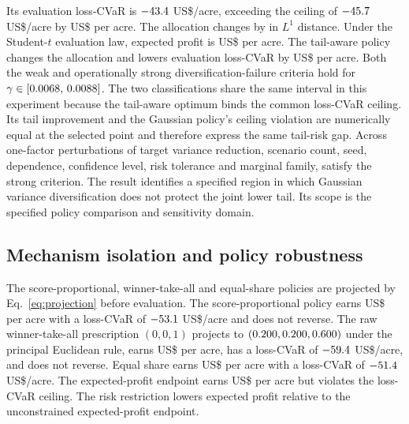 Its evaluation loss-CVaR is
\(-43.4\) US\$/acre, exceeding the ceiling of
\(-45.7\) US\$/acre by
US\$\DiversificationCeilingGap{} per acre. The allocation changes by
\DiversificationAllocationLone{} in \(L^1\) distance. Under the Student-\(t\)
evaluation law, expected profit is US\$\CanonicalMVExpectedProfit{} per acre.
The tail-aware policy changes the allocation and lowers evaluation loss-CVaR
by US\$\DiversificationTailGap{} per acre. Both the weak and operationally
strong diversification-failure criteria hold for
\(\gamma\in[0.0068,\,0.0088]\). The two classifications
share the same interval in this experiment because the tail-aware optimum
binds the common loss-CVaR ceiling. Its tail improvement and the Gaussian
policy's ceiling violation are numerically equal at the selected point and
therefore express the same tail-risk gap. Across
\DiversificationSensitivityCases{} one-factor perturbations of target
variance reduction, scenario count, seed, dependence, confidence level, risk
tolerance and marginal family, \DiversificationSensitivityStrongCases{}
satisfy the strong criterion. The result identifies a specified region in
which Gaussian variance diversification does not protect the joint lower
tail. Its scope is the specified policy comparison and sensitivity domain.

\subsection{Mechanism isolation and policy robustness}

The score-proportional, winner-take-all and equal-share policies are projected
by Eq.~\ref{eq:projection} before evaluation. The score-proportional policy
earns US\$\PolicySuitabilityProfit{} per acre with a loss-CVaR of
\(-53.1\) US\$/acre and does not
reverse. The raw winner-take-all prescription \((0,0,1)\) projects to
\((0.200,0.200,
0.600)\) under the principal Euclidean rule, earns
US\$\ProjectionWinnerLtwoProfit{} per acre, has a loss-CVaR of
\(-59.4\) US\$/acre, and does not reverse. Equal share
earns US\$\PolicyEqualProfit{} per acre with a loss-CVaR of
\(-51.4\) US\$/acre. The expected-profit endpoint earns
US\$\PolicyExpectedProfit{} per acre but violates the loss-CVaR ceiling.
The risk restriction lowers expected profit relative to the unconstrained
expected-profit endpoint.

